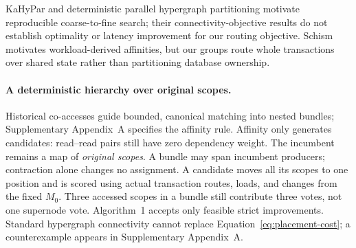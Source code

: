KaHyPar and deterministic parallel hypergraph partitioning motivate reproducible coarse-to-fine search; their connectivity-objective results do not establish optimality or latency improvement for our routing objective. \citep{kahypar,deterministicHypergraph} Schism motivates workload-derived affinities, but our groups route whole transactions over shared state rather than partitioning database ownership. \citep{schism}

\paragraph{A deterministic hierarchy over original scopes.}
Historical co-accesses guide bounded, canonical matching into nested bundles; Supplementary Appendix~A specifies the affinity rule. Affinity only generates candidates: read--read pairs still have zero dependency weight. The incumbent remains a map of \emph{original scopes}. A bundle may span incumbent producers; contraction alone changes no assignment. A candidate moves all its scopes to one position and is scored using actual transaction routes, loads, and changes from the fixed \(M_0\). Three accessed scopes in a bundle still contribute three votes, not one supernode vote. Algorithm~1 accepts only feasible strict improvements. Standard hypergraph connectivity cannot replace Equation~\ref{eq:placement-cost}; a counterexample appears in Supplementary Appendix~A.

